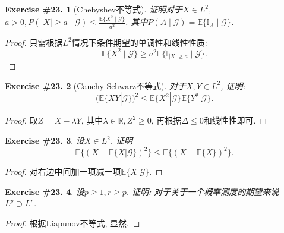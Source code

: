 \documentclass[UTF8, a4paper]{article}
\newtheorem{exercise}{Exercise \#23.}
\begin{document}
\begin{framed}
\begin{exercise}[Chebyshev不等式]
证明对于\(X \in L^2\), \(a > 0, P(|X| \geq a \mid \mathcal{G}) \leq \frac{\mathbb{E}\{X^2 \mid \mathcal{G}\}}{a^2}\).
其中\(P(A\mid \mathcal{G}) = \mathbb{E}\{\mathbb{I}_A \mid \mathcal{G}\}\).
\end{exercise}
\end{framed}

\begin{proof}
只需根据\(L^2\)情况下条件期望的单调性和线性性质:
$$
\mathbb{E}\{X^2 \mid \mathcal{G}\} \geq a^2 \mathbb{E}\{\mathbb{I}_{|X| \geq a} \mid \mathcal{G}\}.
$$
\end{proof}



\begin{framed}
\begin{exercise}[Cauchy-Schwarz不等式]
对于\(X,Y \in L^2\), 证明: 
$$(\mathbb{E}\{XY|\mathcal{G}\})^2\leq \mathbb{E}\{X^2|\mathcal{G}\}\mathbb{E}\{Y^2|\mathcal{G}\}.$$
\end{exercise}
\end{framed}

\begin{proof}
取\(Z = X - \lambda Y\), 其中\(\lambda \in \mathbb{R}, Z^2 \geq 0 \),
再根据\(\Delta \leq 0\)和线性性即可.
\end{proof}



\begin{framed}
\begin{exercise}
    设\(X \in L^2\). 证明 $$\mathbb{E}\{(X-\mathbb{E}\{X|\mathcal{G}\})^2\}\leq \mathbb{E}\{(X-\mathbb{E}\{X\})^2\}.$$
\end{exercise}
\end{framed}

\begin{proof}
对右边中间加一项减一项\(\mathbb{E}\{X | \mathcal{G}\}\).
\end{proof}





\begin{framed}
\begin{exercise}
设\(p \geq 1, r \geq p\).
证明: 对于关于一个概率测度的期望来说\(L^p \supset L^r\). 
\end{exercise}
\end{framed}

\begin{proof}
根据Liapunov不等式, 显然.
\end{proof}
\end{document}
